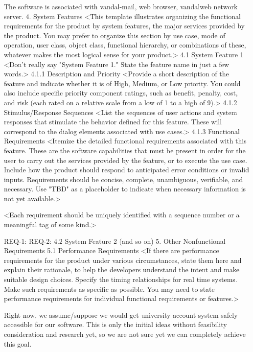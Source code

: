 The software is associated with vandal-mail, web browser, vandalweb network server.
4.	System Features
<This template illustrates organizing the functional requirements for the product by system features, the major services provided by the product. You may prefer to organize this section by use case, mode of operation, user class, object class, functional hierarchy, or combinations of these, whatever makes the most logical sense for your product.>
4.1	System Feature 1
<Don't really say "System Feature 1." State the feature name in just a few words.>
4.1.1	Description and Priority
	<Provide a short description of the feature and indicate whether it is of High, Medium, or Low priority. You could also include specific priority component ratings, such as benefit, penalty, cost, and risk (each rated on a relative scale from a low of 1 to a high of 9).>
4.1.2	Stimulus/Response Sequences
	<List the sequences of user actions and system responses that stimulate the behavior defined for this feature. These will correspond to the dialog elements associated with use cases.>
4.1.3	Functional Requirements
	<Itemize the detailed functional requirements associated with this feature. These are the software capabilities that must be present in order for the user to carry out the services provided by the feature, or to execute the use case. Include how the product should respond to anticipated error conditions or invalid inputs. Requirements should be concise, complete, unambiguous, verifiable, and necessary. Use "TBD" as a placeholder to indicate when necessary information is not yet available.>
	
	<Each requirement should be uniquely identified with a sequence number or a meaningful tag of some kind.>
	
REQ-1:	
REQ-2:	
4.2	System Feature 2 (and so on)
5.	Other Nonfunctional Requirements
5.1	Performance Requirements
<If there are performance requirements for the product under various circumstances, state them here and explain their rationale, to help the developers understand the intent and make suitable design choices. Specify the timing relationships for real time systems. Make such requirements as specific as possible. You may need to state performance requirements for individual functional requirements or features.>

Right now, we assume/suppose we would get university account system safely accessible for our software. This is only the initial ideas without feasibility consideration and research yet, so we are not sure yet we can completely achieve this goal.

